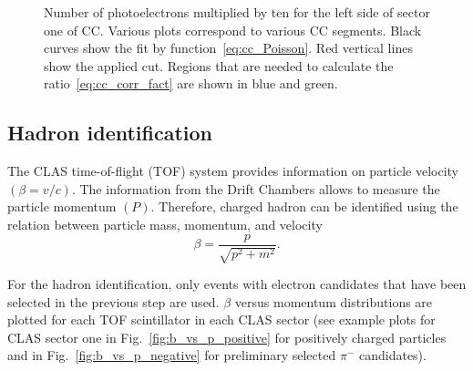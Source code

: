 

\begin{figure}[htp]
\begin{center}
\caption{\small  Number of photoelectrons multiplied by ten for the left side of sector one of CC. Various plots correspond to various CC segments. Black curves show the fit by function~\ref{eq:cc_Poisson}. Red vertical lines show the applied cut. Regions that are needed to calculate the ratio~\ref{eq:cc_corr_fact} are shown in blue and green.} \label{fig:nphe_cut}
\end{center}
\end{figure}





\subsection{Hadron identification}
\label{hadron}

The CLAS time-of-flight (TOF) system provides information on particle
velocity $(\beta= v/c)$.  The information from the Drift
Chambers allows to measure the particle momentum $(P)$. Therefore,
charged hadron can be identified using the relation between particle
mass, momentum, and velocity
\begin{equation}
\beta=\frac{p}{\sqrt{p^{2}+m^{2}}}.
\label{eq:hadron_hadronmass}
\end{equation}

For the hadron identification, only events with electron candidates that have been selected in the previous step are used.
$\beta$ versus momentum distributions are plotted for each TOF scintillator in each CLAS sector (see example plots for CLAS sector one in Fig.~\ref{fig:b_vs_p_positive} for positively charged particles and in Fig.~\ref{fig:b_vs_p_negative} for preliminary selected $\pi^{-}$ candidates). 

